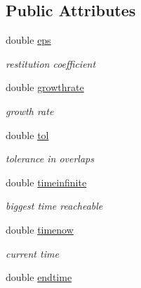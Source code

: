 \subsection*{Public Attributes}
\begin{CompactItemize}
\item 
\hypertarget{classEDsimul_c024fcd847c84abdbeda15bd19d1b0f8}{
double \hyperlink{classEDsimul_c024fcd847c84abdbeda15bd19d1b0f8}{eps}}
\label{classEDsimul_c024fcd847c84abdbeda15bd19d1b0f8}

\begin{CompactList}\small\item\em restitution coefficient \item\end{CompactList}\item 
\hypertarget{classEDsimul_c6693871a10649e25adc4d43d7523a6f}{
double \hyperlink{classEDsimul_c6693871a10649e25adc4d43d7523a6f}{growthrate}}
\label{classEDsimul_c6693871a10649e25adc4d43d7523a6f}

\begin{CompactList}\small\item\em growth rate \item\end{CompactList}\item 
\hypertarget{classEDsimul_653c1490dcaf4885d5c78ce84d570a57}{
double \hyperlink{classEDsimul_653c1490dcaf4885d5c78ce84d570a57}{tol}}
\label{classEDsimul_653c1490dcaf4885d5c78ce84d570a57}

\begin{CompactList}\small\item\em tolerance in overlaps \item\end{CompactList}\item 
\hypertarget{classEDsimul_84002fcf165166baebe0bffbf5f84500}{
double \hyperlink{classEDsimul_84002fcf165166baebe0bffbf5f84500}{timeinfinite}}
\label{classEDsimul_84002fcf165166baebe0bffbf5f84500}

\begin{CompactList}\small\item\em biggest time reacheable \item\end{CompactList}\item 
\hypertarget{classEDsimul_ea9c4239caf7edea34ac971de39b1ed6}{
double \hyperlink{classEDsimul_ea9c4239caf7edea34ac971de39b1ed6}{timenow}}
\label{classEDsimul_ea9c4239caf7edea34ac971de39b1ed6}

\begin{CompactList}\small\item\em current time \item\end{CompactList}\item 
\hypertarget{classEDsimul_afdd25e2f855e6526fa2f472db244ba4}{
double \hyperlink{classEDsimul_afdd25e2f855e6526fa2f472db244ba4}{endtime}}
\label{classEDsimul_afdd25e2f855e6526fa2f472db244ba4}


\end{CompactItemize}
